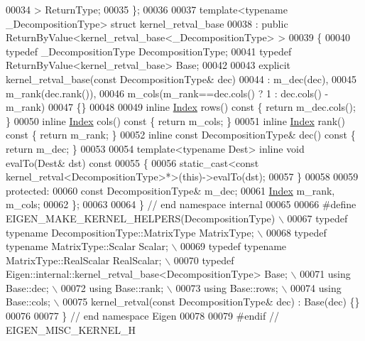 \begin{DoxyCode}
00034   > ReturnType;
00035 \};
00036 
00037 \textcolor{keyword}{template}<\textcolor{keyword}{typename} \_DecompositionType> \textcolor{keyword}{struct }kernel\_retval\_base
00038  : \textcolor{keyword}{public} ReturnByValue<kernel\_retval\_base<\_DecompositionType> >
00039 \{
00040   \textcolor{keyword}{typedef} \_DecompositionType DecompositionType;
00041   \textcolor{keyword}{typedef} ReturnByValue<kernel\_retval\_base> Base;
00042 
00043   \textcolor{keyword}{explicit} kernel\_retval\_base(\textcolor{keyword}{const} DecompositionType& dec)
00044     : m\_dec(dec),
00045       m\_rank(dec.rank()),
00046       m\_cols(m\_rank==dec.cols() ? 1 : dec.cols() - m\_rank)
00047   \{\}
00048 
00049   \textcolor{keyword}{inline} \hyperlink{namespace_eigen_a62e77e0933482dafde8fe197d9a2cfde}{Index} rows()\textcolor{keyword}{ const }\{ \textcolor{keywordflow}{return} m\_dec.cols(); \}
00050   \textcolor{keyword}{inline} \hyperlink{namespace_eigen_a62e77e0933482dafde8fe197d9a2cfde}{Index} cols()\textcolor{keyword}{ const }\{ \textcolor{keywordflow}{return} m\_cols; \}
00051   \textcolor{keyword}{inline} \hyperlink{namespace_eigen_a62e77e0933482dafde8fe197d9a2cfde}{Index} rank()\textcolor{keyword}{ const }\{ \textcolor{keywordflow}{return} m\_rank; \}
00052   \textcolor{keyword}{inline} \textcolor{keyword}{const} DecompositionType& dec()\textcolor{keyword}{ const }\{ \textcolor{keywordflow}{return} m\_dec; \}
00053 
00054   \textcolor{keyword}{template}<\textcolor{keyword}{typename} Dest> \textcolor{keyword}{inline} \textcolor{keywordtype}{void} evalTo(Dest& dst)\textcolor{keyword}{ const}
00055 \textcolor{keyword}{  }\{
00056     \textcolor{keyword}{static\_cast<}\textcolor{keyword}{const }kernel\_retval<DecompositionType>*\textcolor{keyword}{>}(\textcolor{keyword}{this})->evalTo(dst);
00057   \}
00058 
00059   \textcolor{keyword}{protected}:
00060     \textcolor{keyword}{const} DecompositionType& m\_dec;
00061     \hyperlink{namespace_eigen_a62e77e0933482dafde8fe197d9a2cfde}{Index} m\_rank, m\_cols;
00062 \};
00063 
00064 \} \textcolor{comment}{// end namespace internal}
00065 
00066 \textcolor{preprocessor}{#define EIGEN\_MAKE\_KERNEL\_HELPERS(DecompositionType) \(\backslash\)}
00067 \textcolor{preprocessor}{  typedef typename DecompositionType::MatrixType MatrixType; \(\backslash\)}
00068 \textcolor{preprocessor}{  typedef typename MatrixType::Scalar Scalar; \(\backslash\)}
00069 \textcolor{preprocessor}{  typedef typename MatrixType::RealScalar RealScalar; \(\backslash\)}
00070 \textcolor{preprocessor}{  typedef Eigen::internal::kernel\_retval\_base<DecompositionType> Base; \(\backslash\)}
00071 \textcolor{preprocessor}{  using Base::dec; \(\backslash\)}
00072 \textcolor{preprocessor}{  using Base::rank; \(\backslash\)}
00073 \textcolor{preprocessor}{  using Base::rows; \(\backslash\)}
00074 \textcolor{preprocessor}{  using Base::cols; \(\backslash\)}
00075 \textcolor{preprocessor}{  kernel\_retval(const DecompositionType& dec) : Base(dec) \{\}}
00076 
00077 \} \textcolor{comment}{// end namespace Eigen}
00078 
00079 \textcolor{preprocessor}{#endif // EIGEN\_MISC\_KERNEL\_H}
\end{DoxyCode}
